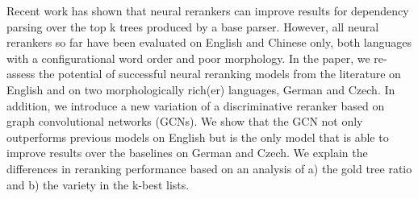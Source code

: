 Recent work has shown that neural rerankers can improve results for dependency parsing over the top k trees produced by a base parser. However, all neural rerankers so far have been evaluated on English and Chinese only, both languages with a configurational word order and poor morphology. In the paper, we re-assess the potential of successful neural reranking models from the literature on English and on two morphologically rich(er) languages, German and Czech. In addition, we introduce a new variation of a discriminative reranker based on graph convolutional networks (GCNs). We show that the GCN not only outperforms previous models on English but is the only model that is  able to improve results over the baselines on German and Czech. We explain the differences in reranking performance based on an analysis of a) the gold tree ratio and b) the variety in the k-best lists.
